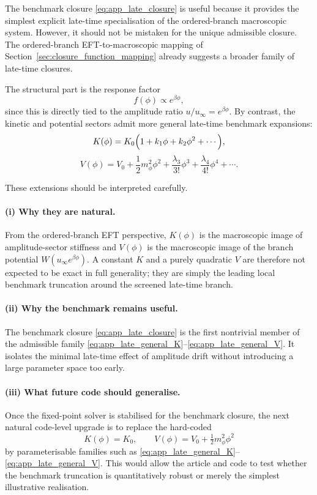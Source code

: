 \documentclass[11pt,a4paper]{article}
\numberwithin{equation}{section}
\begin{document}
The benchmark closure
\eqref{eq:app_late_closure}
is useful because it provides the simplest explicit late-time
specialisation of the ordered-branch macroscopic system.
However, it should not be mistaken for the unique admissible closure.
The ordered-branch EFT-to-macroscopic mapping of
Section~\ref{sec:closure_function_mapping}
already suggests a broader family of late-time closures.

The structural part is the response factor
\[
f(\phi)\propto e^{\beta\phi},
\]
since this is directly tied to the amplitude ratio
$u/u_\infty=e^{\beta\phi}$.
By contrast, the kinetic and potential sectors admit more general
late-time benchmark expansions:
\begin{equation}
  \label{eq:app_late_general_K}
  K(\phi)=K_0\Bigl(1+k_1\phi+k_2\phi^2+\cdots\Bigr),
\end{equation}
\begin{equation}
  \label{eq:app_late_general_V}
  V(\phi)=V_0+\frac12 m_\phi^2\phi^2
  +\frac{\lambda_3}{3!}\phi^3
  +\frac{\lambda_4}{4!}\phi^4+\cdots.
\end{equation}

These extensions should be interpreted carefully.

\paragraph{(i) Why they are natural.}
From the ordered-branch EFT perspective, $K(\phi)$ is the macroscopic
image of amplitude-sector stiffness and $V(\phi)$ is the macroscopic
image of the branch potential $W(u_\infty e^{\beta\phi})$.
A constant $K$ and a purely quadratic $V$ are therefore not expected to
be exact in full generality; they are simply the leading local
benchmark truncation around the screened late-time branch.

\paragraph{(ii) Why the benchmark remains useful.}
The benchmark closure
\eqref{eq:app_late_closure}
is the first nontrivial member of the admissible family
\eqref{eq:app_late_general_K}--\eqref{eq:app_late_general_V}.
It isolates the minimal late-time effect of amplitude drift without
introducing a large parameter space too early.

\paragraph{(iii) What future code should generalise.}
Once the fixed-point solver is stabilised for the benchmark closure, the
next natural code-level upgrade is to replace the hard-coded
\[
K(\phi)=K_0,
\qquad
V(\phi)=V_0+\tfrac12 m_\phi^2\phi^2
\]
by parameterisable families such as
\eqref{eq:app_late_general_K}--\eqref{eq:app_late_general_V}.
This would allow the article and code to test whether the benchmark
truncation is quantitatively robust or merely the simplest illustrative
realisation.
\end{document}
